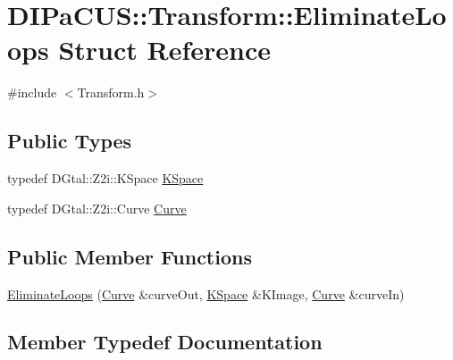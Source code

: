 \hypertarget{structDIPaCUS_1_1Transform_1_1EliminateLoops}{}\section{D\+I\+Pa\+C\+US\+:\+:Transform\+:\+:Eliminate\+Loops Struct Reference}
\label{structDIPaCUS_1_1Transform_1_1EliminateLoops}


{\ttfamily \#include $<$Transform.\+h$>$}

\subsection*{Public Types}
\begin{DoxyCompactItemize}
\item 
typedef D\+Gtal\+::\+Z2i\+::\+K\+Space \mbox{\hyperlink{structDIPaCUS_1_1Transform_1_1EliminateLoops_aed679a455575ffdf2c1e5140fdb451fe}{K\+Space}}
\item 
typedef D\+Gtal\+::\+Z2i\+::\+Curve \mbox{\hyperlink{structDIPaCUS_1_1Transform_1_1EliminateLoops_a61f2dc2fd24bfb776edbd6358e128e03}{Curve}}
\end{DoxyCompactItemize}
\subsection*{Public Member Functions}
\begin{DoxyCompactItemize}
\item 
\mbox{\hyperlink{structDIPaCUS_1_1Transform_1_1EliminateLoops_a5054417882a5fb8867d237ca11eb5867}{Eliminate\+Loops}} (\mbox{\hyperlink{structDIPaCUS_1_1Transform_1_1EliminateLoops_a61f2dc2fd24bfb776edbd6358e128e03}{Curve}} \&curve\+Out, \mbox{\hyperlink{structDIPaCUS_1_1Transform_1_1EliminateLoops_aed679a455575ffdf2c1e5140fdb451fe}{K\+Space}} \&K\+Image, \mbox{\hyperlink{structDIPaCUS_1_1Transform_1_1EliminateLoops_a61f2dc2fd24bfb776edbd6358e128e03}{Curve}} \&curve\+In)
\end{DoxyCompactItemize}


\subsection{Member Typedef Documentation}
\mbox{\label{structDIPaCUS_1_1Transform_1_1EliminateLoops_a61f2dc2fd24bfb776edbd6358e128e03}} 
